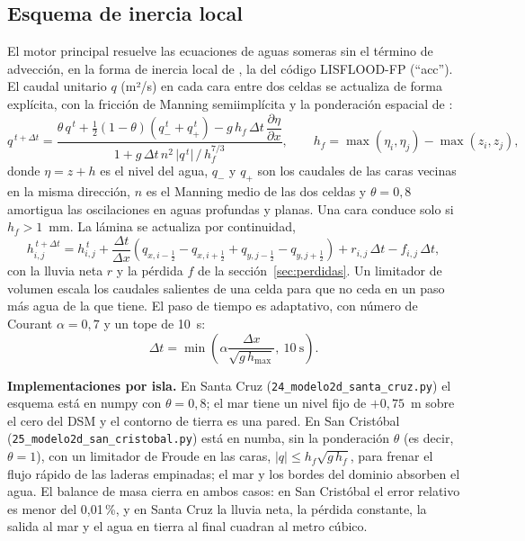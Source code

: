 \documentclass{sosg-informe}
\begin{document}
\subsection{Esquema de inercia local}\label{sec:motor}
El motor principal resuelve las ecuaciones de aguas someras sin el término de advección, en la forma de inercia local de \citet{bates2010}, la del código LISFLOOD-FP (\enquote{acc}). El caudal unitario $q$ (m²/s) en cada cara entre dos celdas se actualiza de forma explícita, con la fricción de Manning semiimplícita y la ponderación espacial de \citet{dealmeida2012}:
\begin{equation}
  q^{\,t+\Delta t} = \frac{\theta\, q^{\,t} + \tfrac{1}{2}(1-\theta)\left(q^{\,t}_{-} + q^{\,t}_{+}\right) - g\, h_f\, \Delta t\, \dfrac{\partial \eta}{\partial x}}{1 + g\, \Delta t\, n^2\, \lvert q^{\,t}\rvert \,/\, h_f^{7/3}},
  \qquad h_f = \max(\eta_i, \eta_j) - \max(z_i, z_j),
  \label{eq:inercia}
\end{equation}
donde $\eta = z + h$ es el nivel del agua, $q_{-}$ y $q_{+}$ son los caudales de las caras vecinas en la misma dirección, $n$ es el Manning medio de las dos celdas y $\theta = 0,8$ amortigua las oscilaciones en aguas profundas y planas. Una cara conduce solo si $h_f > 1$~mm. La lámina se actualiza por continuidad,
\begin{equation}
  h_{i,j}^{\,t+\Delta t} = h_{i,j}^{\,t} + \frac{\Delta t}{\Delta x}\left(q_{x,i-\frac12}-q_{x,i+\frac12}+q_{y,j-\frac12}-q_{y,j+\frac12}\right) + r_{i,j}\,\Delta t - f_{i,j}\,\Delta t ,
\end{equation}
con la lluvia neta $r$ y la pérdida $f$ de la sección~\ref{sec:perdidas}. Un limitador de volumen escala los caudales salientes de una celda para que no ceda en un paso más agua de la que tiene. El paso de tiempo es adaptativo, con número de Courant $\alpha = 0,7$ y un tope de 10~s:
\begin{equation}
  \Delta t = \min\!\left(\alpha \frac{\Delta x}{\sqrt{g\, h_{\max}}},\ 10~\mathrm{s}\right).
\end{equation}

\textbf{Implementaciones por isla.} En Santa Cruz (\texttt{24\_modelo2d\_santa\_cruz.py}) el esquema está en numpy con $\theta = 0,8$; el mar tiene un nivel fijo de $+0,75$~m sobre el cero del DSM y el contorno de tierra es una pared. En San Cristóbal (\texttt{25\_modelo2d\_san\_cristobal.py}) está en numba, sin la ponderación $\theta$ (es decir, $\theta = 1$), con un limitador de Froude en las caras, $\lvert q \rvert \leq h_f \sqrt{g\,h_f}$, para frenar el flujo rápido de las laderas empinadas; el mar y los bordes del dominio absorben el agua. El balance de masa cierra en ambos casos: en San Cristóbal el error relativo es menor del 0,01\,\%, y en Santa Cruz la lluvia neta, la pérdida constante, la salida al mar y el agua en tierra al final cuadran al metro cúbico.
\end{document}
